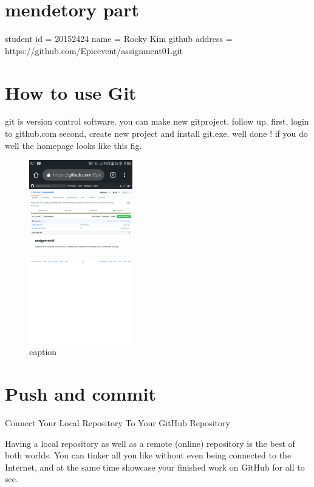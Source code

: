 \documentclass{article}
\begin{document}
\section {mendetory part}
student id = 20152424
name = Rocky Kim
github address = https://github.com/Epicevent/assignment01.git
\section{How to use Git}

git is version control software.
you can make new gitproject.
 follow up.
first, login to github.com
second, create new project and install git.exe.
well done ! if you do well
the homepage looks like this fig.
\begin{figure}
\centering
\includegraphics[width=0.4\textwidth]{1537445777178}
\caption{caption}
\end{figure}
\section{Push and commit}
Connect Your Local Repository To Your GitHub Repository

Having a local repository as well as a remote (online) repository is the best of both worlds. You can tinker all you like without even being connected to the Internet, and at the same time showcase your finished work on GitHub for all to see.



%
%
\end{document}
